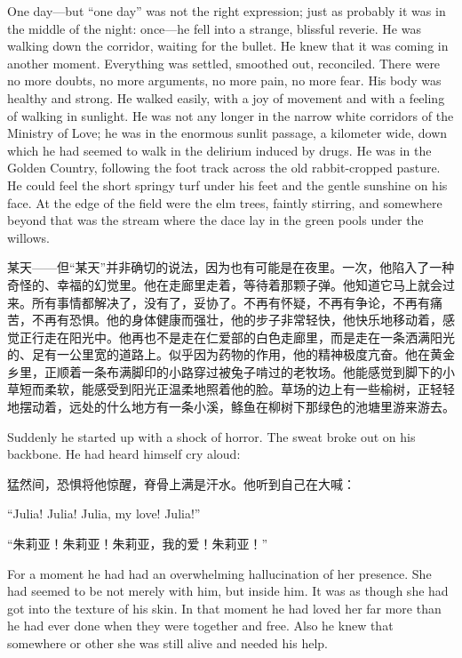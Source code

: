 \begin{paracol}{2}
\switchcolumn*

One day---but ``one day'' was not the right expression; just as probably
it was in the middle of the night: once---he fell into a strange,
blissful reverie. He was walking down the corridor, waiting for the
bullet. He knew that it was coming in another moment. Everything was
settled, smoothed out, reconciled. There were no more doubts, no more
arguments, no more pain, no more fear. His body was healthy and strong.
He walked easily, with a joy of movement and with a feeling of walking
in sunlight. He was not any longer in the narrow white corridors of the
Ministry of Love; he was in the enormous sunlit passage, a kilometer
wide, down which he had seemed to walk in the delirium induced by drugs.
He was in the Golden Country, following the foot track across the old
rabbit-cropped pasture. He could feel the short springy turf under his
feet and the gentle sunshine on his face. At the edge of the field were
the elm trees, faintly stirring, and somewhere beyond that was the
stream where the dace lay in the green pools under the willows.

\switchcolumn

某天——但``某天''并非确切的说法，因为也有可能是在夜里。一次，他陷入了一种奇怪的、幸福的幻觉里。他在走廊里走着，等待着那颗子弹。他知道它马上就会过来。所有事情都解决了，没有了，妥协了。不再有怀疑，不再有争论，不再有痛苦，不再有恐惧。他的身体健康而强壮，他的步子非常轻快，他快乐地移动着，感觉正行走在阳光中。他再也不是走在仁爱部的白色走廊里，而是走在一条洒满阳光的、足有一公里宽的道路上。似乎因为药物的作用，他的精神极度亢奋。他在黄金乡里，正顺着一条布满脚印的小路穿过被兔子啃过的老牧场。他能感觉到脚下的小草短而柔软，能感受到阳光正温柔地照着他的脸。草场的边上有一些榆树，正轻轻地摆动着，远处的什么地方有一条小溪，鲦鱼在柳树下那绿色的池塘里游来游去。

\switchcolumn*

Suddenly he started up with a shock of horror. The sweat broke out on
his backbone. He had heard himself cry aloud:

\switchcolumn

猛然间，恐惧将他惊醒，脊骨上满是汗水。他听到自己在大喊：

\switchcolumn*

``Julia! Julia! Julia, my love! Julia!''

\switchcolumn

``朱莉亚！朱莉亚！朱莉亚，我的爱！朱莉亚！''

\switchcolumn*

For a moment he had had an overwhelming hallucination of her presence.
She had seemed to be not merely with him, but inside him. It was as
though she had got into the texture of his skin. In that moment he had
loved her far more than he had ever done when they were together and
free. Also he knew that somewhere or other she was still alive and
needed his help.


\end{paracol}
